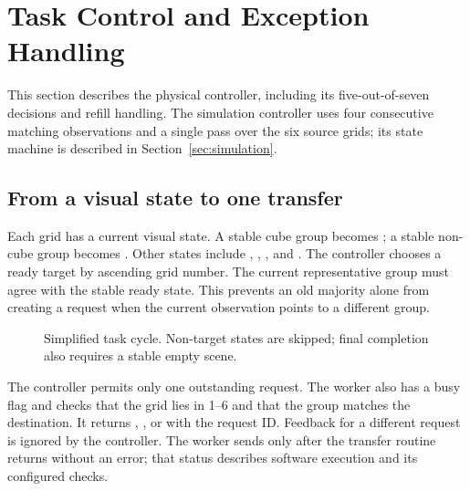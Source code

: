 \section{Task Control and Exception Handling}
This section describes the physical controller, including its five-out-of-seven decisions and refill handling. The simulation controller uses four consecutive matching observations and a single pass over the six source grids; its state machine is described in Section~\ref{sec:simulation}.

\subsection{From a visual state to one transfer}
Each grid has a current visual state. A stable cube group becomes ; a stable non-cube group becomes . Other states include , , , and . The controller chooses a ready target by ascending grid number. The current representative group must agree with the stable ready state. This prevents an old majority alone from creating a request when the current observation points to a different group.

\begin{figure}[H]\centering
{}
\caption{Simplified task cycle. Non-target states are skipped; final completion also requires a stable empty scene.}
\end{figure}

The controller permits only one outstanding request. The worker also has a busy flag and checks that the grid lies in 1--6 and that the group matches the destination. It returns , , or  with the request ID. Feedback for a different request is ignored by the controller. The worker sends  only after the transfer routine returns without an error; that status describes software execution and its configured checks.

